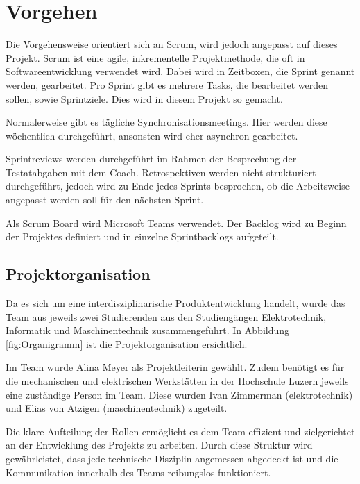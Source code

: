 \section{Vorgehen}

Die Vorgehensweise orientiert sich an Scrum, wird jedoch angepasst auf dieses Projekt.
Scrum ist eine agile, inkrementelle Projektmethode, die oft in Softwareentwicklung verwendet wird. Dabei wird in Zeitboxen, die Sprint genannt werden, gearbeitet. Pro Sprint gibt es mehrere Tasks, die bearbeitet werden sollen, sowie Sprintziele. Dies wird in diesem Projekt so gemacht.\cite{wikipedia-scrum}

Normalerweise gibt es tägliche Synchronisationsmeetings. Hier werden diese wöchentlich durchgeführt, ansonsten wird eher asynchron gearbeitet.

Sprintreviews werden durchgeführt im Rahmen der Besprechung der Testatabgaben mit dem Coach. Retrospektiven werden nicht strukturiert durchgeführt, jedoch wird zu Ende jedes Sprints besprochen, ob die Arbeitsweise angepasst werden soll für den nächsten Sprint.

Als Scrum Board wird Microsoft Teams verwendet. Der Backlog wird zu Beginn der Projektes definiert und in einzelne Sprintbacklogs aufgeteilt.

\subsection{Projektorganisation}

Da es sich um eine interdisziplinarische Produktentwicklung handelt, wurde das Team aus jeweils zwei Studierenden aus den Studiengängen Elektrotechnik, Informatik und Maschinentechnik zusammengeführt. In Abbildung \ref{fig:Organigramm} ist die Projektorganisation ersichtlich. 

Im Team wurde Alina Meyer als Projektleiterin gewählt. Zudem benötigt es für die mechanischen und elektrischen Werkstätten in der Hochschule Luzern jeweils eine zuständige Person im Team. Diese wurden Ivan Zimmerman (\acrshort{elektrotechnik}) und Elias von Atzigen (\acrshort{maschinentechnik}) zugeteilt.

Die klare Aufteilung der Rollen ermöglicht es dem Team effizient und zielgerichtet an der Entwicklung des Projekts zu arbeiten. Durch diese Struktur wird gewährleistet, dass jede technische Disziplin angemessen abgedeckt ist und die Kommunikation innerhalb des Teams reibungslos funktioniert.

